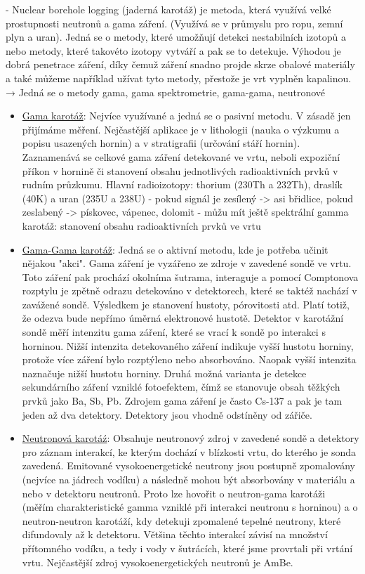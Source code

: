 - Nuclear borehole logging (jaderná karotáž) je metoda, která využívá velké prostupnosti neutronů a gama záření. (Využívá se v průmyslu pro ropu, zemní plyn a uran). Jedná se o metody, které umožňují detekci nestabilních izotopů a nebo metody, které takovéto izotopy vytváří a pak se to detekuje. Výhodou je dobrá penetrace záření, díky čemuž záření snadno projde skrze obalové materiály a také můžeme například užívat tyto metody, přestože je vrt vyplněn kapalinou. → Jedná se o metody gama, gama spektrometrie, gama-gama, neutronové 
\begin{itemize}
    \item \underline{Gama karotáž}: Nejvíce využívané a jedná se o pasivní metodu. V zásadě jen přijímáme měření. Nejčastější aplikace je v lithologii (nauka o výzkumu a popisu usazených hornin) a v stratigrafii (určování stáří hornin). Zaznamenává se celkové gama záření detekované ve vrtu, neboli expoziční příkon v hornině či stanovení obsahu jednotlivých radioaktivních prvků v rudním průzkumu. Hlavní radioizotopy: thorium (230Th a 232Th), draslík (40K) a uran (235U a 238U) - pokud signál je zesílený -> asi břidlice, pokud zeslabený -> pískovec, vápenec, dolomit - můžu mít ještě spektrální gamma karotáž: stanovení obsahu radioaktivních prvků ve vrtu
    \item \underline{Gama-Gama karotáž}: Jedná se o aktivní metodu, kde je potřeba učinit nějakou "akci". Gama záření je vyzářeno ze zdroje v zavedené sondě ve vrtu. Toto záření pak prochází okolníma šutrama, interaguje a pomocí Comptonova rozptylu je zpětně odrazu detekováno v detektorech, které se taktéž nachází v zavážené sondě. Výsledkem je stanovení hustoty, pórovitosti atd. Platí totiž, že odezva bude nepřímo úměrná elektronové hustotě. Detektor v karotážní sondě měří intenzitu gama záření, které se vrací k sondě po interakci s horninou. Nižší intenzita detekovaného záření indikuje vyšší hustotu horniny, protože více záření bylo rozptýleno nebo absorbováno. Naopak vyšší intenzita naznačuje nižší hustotu horniny. Druhá možná varianta je detekce sekundárního záření vzniklé fotoefektem, čímž se stanovuje obsah těžkých prvků jako Ba, Sb, Pb. Zdrojem gama záření je často Cs-137 a pak je tam jeden až dva detektory. Detektory jsou vhodně odstíněny od zářiče.

    \item \underline{Neutronová karotáź}: Obsahuje neutronový zdroj v zavedené sondě a detektory pro záznam interakcí, ke kterým dochází v blízkosti vrtu, do kterého je sonda zavedená. Emitované vysokoenergetické neutrony jsou postupně zpomalovány (nejvíce na jádrech vodíku) a následně mohou být absorbovány v materiálu a nebo v detektoru neutronů. Proto lze hovořit o neutron-gama karotáži (měřím charakteristické gamma vzniklé při interakci neutronu s horninou) a o neutron-neutron karotáží, kdy detekuji zpomalené tepelné neutrony, které difundovaly až k detektoru. Většina těchto interakcí závisí na množství přítomného vodíku, a tedy i vody v šutrácích, které jsme provrtali při vrtání vrtu. Nejčastější zdroj vysokoenergetických neutronů je AmBe. 


\end{itemize}
